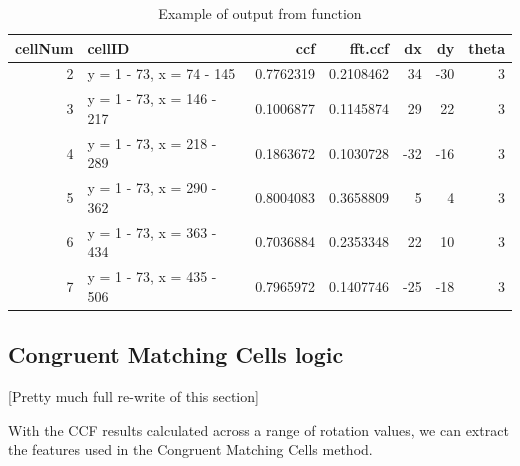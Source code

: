 \begin{Schunk}
\begin{table}[!h]

\caption{\label{tab:unnamed-chunk-8}\label{tab:cellCCF} Example of output from  function}
\centering
\begin{tabular}[t]{r|l|r|r|r|r|r}
\hline
cellNum & cellID & ccf & fft.ccf & dx & dy & theta\\
\hline
2 & y = 1 - 73, x = 74 - 145 & 0.7762319 & 0.2108462 & 34 & -30 & 3\\
\hline
3 & y = 1 - 73, x = 146 - 217 & 0.1006877 & 0.1145874 & 29 & 22 & 3\\
\hline
4 & y = 1 - 73, x = 218 - 289 & 0.1863672 & 0.1030728 & -32 & -16 & 3\\
\hline
5 & y = 1 - 73, x = 290 - 362 & 0.8004083 & 0.3658809 & 5 & 4 & 3\\
\hline
6 & y = 1 - 73, x = 363 - 434 & 0.7036884 & 0.2353348 & 22 & 10 & 3\\
\hline
7 & y = 1 - 73, x = 435 - 506 & 0.7965972 & 0.1407746 & -25 & -18 & 3\\
\hline
\end{tabular}
\end{table}

\end{Schunk}

\hypertarget{congruent-matching-cells-logic}{%
\subsection{Congruent Matching Cells
logic}\label{congruent-matching-cells-logic}}

{[}Pretty much full re-write of this section{]}

With the CCF results calculated across a range of rotation values, we
can extract the features used in the Congruent Matching Cells method.

